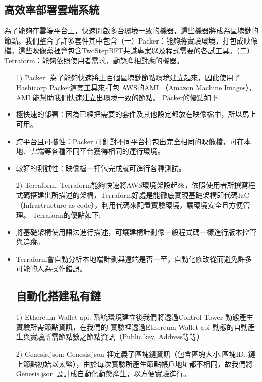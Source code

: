 \subsection{高效率部署雲端系統}\label{se_5} 
為了能夠在雲端平台上，快速開啟多台環境一致的機器，這些機器將成為區塊鏈的節點。我們整合了許多套件其中包含（一）Packer：能夠將實驗環境，打包成映像檔。這些映像黨裡會包含TwoStepBFT共識專案以及程式需要的各試工具。（二）Terraform：能夠依照使用者需求，動態產相對應的機器。
\begin{itemize}%
\item [1)] Packer: 為了能夠快速將上百個區塊鏈節點環境建立起來，因此使用了Hashicorp Packer這套工具來打包 AWS的AMI （Amazon Machine Images），AMI 能幫助我們快速建立出環境一致的節點。
Packer的優點如下

\item 極快速的部署：因為已經把需要的套件及其他設定都放在映像檔中，所以馬上可用。

\item 跨平台且可攜性：Packer 可針對不同平台打包出完全相同的映像檔，可在本地、雲端等各種不同平台獲得相同的運行環境。

\item 較好的測試性：映像檔一打包完成就可進行各種測試。

\item [2)] Terraform: Terraform能夠快速將AWS環境架設起來，依照使用者所撰寫程式碼搭建出所描述的架構，Terraform好處是能徹底實現基礎架構即代碼IaC （Infrastructure as code），利用代碼來配置實驗環境，讓環境安全且方便管理。
Terraform的優點如下:
\item   將基礎架構使用語法進行描述，可讓建構計劃像一般程式碼一樣進行版本控管與追蹤。 

\item Terraform會自動分析本地端計劃與遠端是否一至，自動化修改從而避免許多可能的人為操作錯誤。

\subsection{自動化搭建私有鏈}\label{se_5} 

\item [1)] Ethereum Wallet api: 系統環境建立後我們將透過Control Tower 動態產生實驗所需節點資訊，在我們的 實驗裡透過Ethereum Wallet api 動態的自動產生與實驗所需節點數之節點資訊（Public key, Address等等）

\item [2)] Genesis.json: Genesis.json 裡定義了區塊鏈資訊（包含區塊大小,區塊ID, 鏈上節點初始以太幣），由於每次實驗所產生節點帳戶地址都不相同，故我們將Genesis.json 設計成自動化動態產生，以方便實驗進行。 


\end{itemize}
